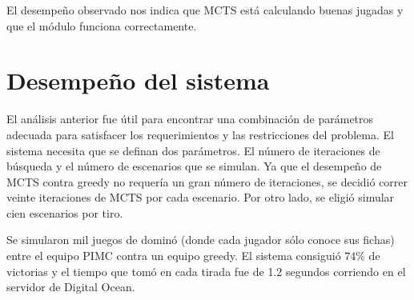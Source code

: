 El desempeño observado nos indica que MCTS está calculando buenas jugadas y que
el módulo funciona correctamente.


\section{Desempeño del sistema}

El análisis anterior fue útil para encontrar una combinación de parámetros
adecuada para satisfacer los requerimientos y las restricciones del problema. El
sistema necesita que se definan dos parámetros. El número de iteraciones de
búsqueda y el número de escenarios que se simulan. Ya que el desempeño de MCTS
contra greedy no requería un gran número de iteraciones, se decidió correr
veinte iteraciones de MCTS por cada escenario. Por otro lado, se eligió simular
cien escenarios por tiro.

Se simularon mil juegos de dominó (donde cada jugador sólo conoce sus fichas)
entre el equipo PIMC contra un equipo greedy. El sistema consiguió 74\% de
victorias y el tiempo que tomó en cada tirada fue de 1.2 segundos corriendo en
el servidor de Digital Ocean.
